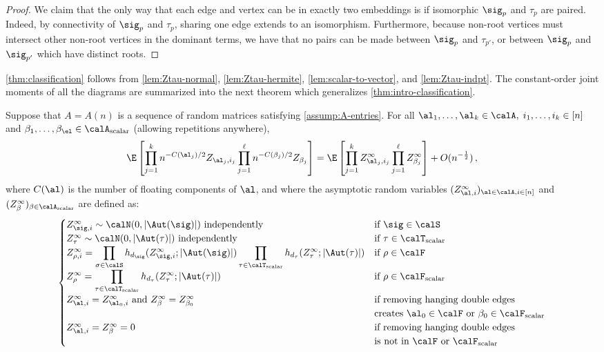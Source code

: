 \documentclass[12pt]{article}
\newcommand{\scalar}{\textnormal{scalar}}
\begin{document}
\begin{proof}
    We claim that the only way that each edge and vertex can be in exactly two embeddings is if isomorphic
    $\sig_p$ and $\tau_p$ are paired.
    Indeed, by connectivity of $\sig_p$ and $\tau_p$, sharing one edge extends to an isomorphism.
    Furthermore, because non-root vertices must intersect other non-root
    vertices in the dominant terms, we have that no pairs can be made between
    $\sig_p$ and $\tau_{p'}$, or between $\sig_p$ and $\sig_{p'}$
    which have distinct roots.
\end{proof}

\cref{thm:classification} follows from \cref{lem:Ztau-normal}, \cref{lem:Ztau-hermite}, \cref{lem:scalar-to-vector}, and \cref{lem:Ztau-indpt}.
The constant-order joint moments of all the diagrams
are summarized into the next theorem which generalizes \cref{thm:intro-classification}.

\begin{theorem}\label{all-moments}
    Suppose that $A = A(n)$ is a sequence of random matrices satisfying \cref{assump:A-entries}.
    For all $\al_1, \dots, \al_k \in \calA, \; i_1, \dots, i_k \in [n]$ and $\beta_1, \dots, \beta_\el \in \calA_\scalar$ (allowing repetitions anywhere), \[
        \E\left[\prod_{j = 1}^k n^{-C(\al_j)/2}Z_{\al_j, i_j} \prod_{j = 1}^\ell n^{-C(\beta_j)/2}Z_{\beta_j} \right] = \E\left[\prod_{j = 1}^k Z_{\al_j,i_j}^\infty \prod_{j = 1}^\ell Z^\infty_{\beta_j} \right] + O(n^{-\frac 12})\,,
    \]
    where $C(\al)$ is the number of floating components of $\al$,
    and where the asymptotic random variables $(Z_{\al,i}^\infty)_{\al \in \calA, i \in [n]}$ and $(Z_\beta^\infty)_{\beta \in \calA_\scalar}$ are defined as:
    \[
    \allowdisplaybreaks
    \begin{cases}
        Z_{\sig,i}^\infty \sim \calN(0, \left|\Aut(\sig)\right|) \text{ independently}& \text{if $\sig \in \calS$}\\
        Z_\tau^\infty \sim \calN(0, \left|\Aut(\tau)\right|) \text{ independently}& \text{if $\tau \in \calT_\scalar$}\\
        \displaystyle Z_{\rho,i}^\infty = \prod_{\sigma \in \calS} h_{d_\sig}(Z_{\sig,i}^\infty; \left|\Aut(\sig)\right|) \prod_{\tau \in \calT_\scalar} h_{d_{\tau}}(Z_\tau^\infty; \left|\Aut(\tau)\right|) & \text{if $\rho \in \calF$}\\
        \displaystyle Z_\rho^\infty = \prod_{\tau \in \calT_\scalar} h_{d_{\tau}}(Z_\tau^\infty; \left|\Aut(\tau)\right|) & \text{if $\rho \in \calF_\scalar$}\\
        Z_{\al,i}^\infty = Z_{\al_0, i}^\infty  \text{ and }Z_\beta^\infty = Z_{\beta_0}^\infty & \text{if removing hanging double edges}\\&\text{creates $\al_0 \in \calF$ or $\beta_0 \in \calF_\scalar$}\\
        Z_{\al,i}^\infty = Z_\beta^\infty = 0 & \text{if removing hanging double edges}\\&\text{is not in $\calF$ or $\calF_\scalar$} \end{cases}
    \]
\end{theorem} 
\end{document}
